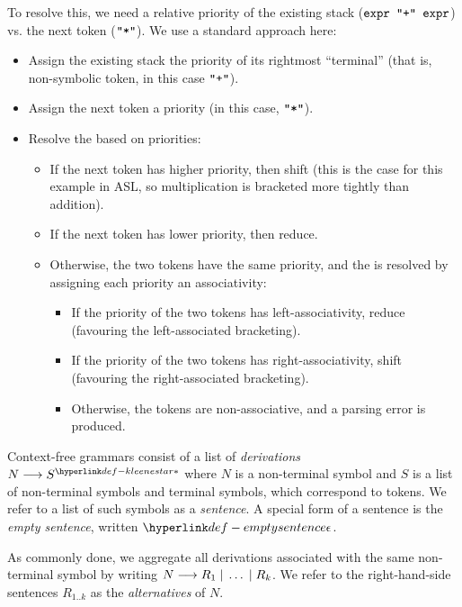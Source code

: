 To resolve this, we need a relative priority of the existing stack
($\texttt{expr \texttt{"}\texttt{+}\texttt{"}{} expr}$) vs. the next token ($\texttt{"}\texttt{*}\texttt{"}$).
We use a standard approach here:
\begin{itemize}
\item Assign the existing stack the priority of its rightmost ``terminal''
      (that is, non-symbolic token, in this case $\texttt{"}\texttt{+}\texttt{"}$).
\item Assign the next token a priority (in this case, $\texttt{"}\texttt{*}\texttt{"}$).
\item Resolve the \shiftreduceconflictterm{} based on priorities:
  \begin{itemize}
  \item If the next token has higher priority, then shift (this is the case for this
        example in ASL, so multiplication is bracketed more tightly than addition).
  \item If the next token has lower priority, then reduce.
  \item Otherwise, the two tokens have the same priority, and the \shiftreduceconflictterm{} is resolved
        by assigning each priority an associativity:
        \begin{itemize}
        \item If the priority of the two tokens has left-associativity, reduce
        (favouring the left-associated bracketing).
        \item If the priority of the two tokens has right-associativity, shift
        (favouring the right-associated bracketing).
        \item Otherwise, the tokens are non-associative, and a parsing error is produced.
        \end{itemize}
  \end{itemize}
\end{itemize}

\ChapterOutline

Context-free grammars consist of a list of \emph{derivations} $N \derives \KleeneStar{S}$
where $N$ is a non-terminal symbol and $S$ is a list of non-terminal symbols and terminal symbols,
which correspond to tokens.
We refer to a list of such symbols as a \emph{sentence}.
\hypertarget{def-emptysentence}{}
A special form of a sentence is the \emph{empty sentence}, written $\emptysentence$.

As commonly done, we aggregate all derivations associated with the same non-terminal symbol
by writing $N \longrightarrow R_1 \;|\; \ldots \;|\; R_k$.
We refer to the right-hand-side sentences $R_{1..k}$ as the \emph{alternatives} of $N$.

